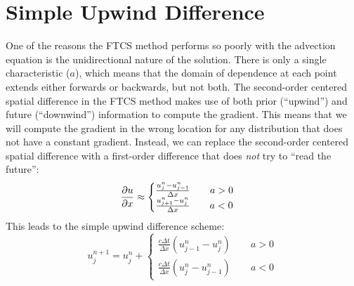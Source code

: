 \documentclass[%
 reprint,
 amsmath,amssymb,
 aps,
]{revtex4-2}
\begin{document}
\section{Simple Upwind Difference}

One of the reasons the FTCS method performs so poorly with the advection equation is the unidirectional nature of the solution. There is only a single characteristic ($a$), which means that the domain of dependence at each point extends either forwards or backwards, but not both. The second-order centered spatial difference in the FTCS method makes use of both prior (``upwind'') and future (``downwind'') information to compute the gradient. This means that we will compute the gradient in the wrong location for any distribution that does not have a constant gradient. Instead, we can replace the second-order centered spatial difference with a first-order difference that does \emph{not} try to ``read the future'':
\begin{equation}
\pdv{u}{x} \approx \begin{cases} \frac{u_j ^n - u_{j-1} ^n}{\Delta x} \qquad  a > 0 \\
\frac{u_{j+1} ^n - u_{j} ^n}{\Delta x} \qquad  a < 0\end{cases}
\end{equation}
This leads to the simple upwind difference scheme:
\begin{equation}
u_j ^{n+1} = u_j ^n + \begin{cases} \frac{c \Delta t}{\Delta x} (u_{j-1} ^n - u_j ^n) \qquad a > 0 \\
\frac{c \Delta t}{\Delta x} (u_j ^n - u_{j-1} ^n) \qquad a < 0 \end{cases}
\end{equation}
\end{document}
